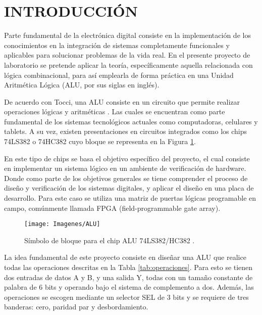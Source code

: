 \documentclass[journal,trans]{IEEEtran}
\begin{document}
\maketitle
\IEEEdisplaynontitleabstractindextext
\IEEEpeerreviewmaketitle

\section{INTRODUCCIÓN}

Parte fundamental de la electrónica digital consiste en la implementación de los conocimientos en la integración de sistemas completamente funcionales y aplicables para solucionar problemas de la vida real. En el presente proyecto de laboratorio se pretende aplicar la teoría, específicamente aquella relacionada con lógica combinacional, para así emplearla de forma práctica en una Unidad Aritmética Lógica (ALU, por sus siglas en inglés). 

De acuerdo con Tocci, una ALU consiste en un circuito que permite realizar operaciones lógicas y aritméticas \cite{Tocci}. Las cuales se encuentran como parte fundamental de los sistemas tecnológicos actuales como computadoras, celulares y tablets. A su vez, existen presentaciones en circuitos integrados como los chips 74LS382 o 74HC382 cuyo bloque se representa en la Figura \ref{fig:ALU}. 

En este tipo de chips se basa el objetivo específico del proyecto, el cual consiste en implementar un sistema lógico en un ambiente de verificación de hardware. Donde como parte de los objetivos generales se tiene comprender el proceso de diseño y verificación de los sistemas digitales, y aplicar el diseño en una placa de desarrollo. Para este caso se utiliza una matriz de puertas lógicas programable en campo, comúnmente llamada FPGA (field-programmable gate array).

\begin{figure}[!h]
	\centering
	\texttt{[image: Imagenes/ALU]}
	\caption{Símbolo de bloque para el chip ALU 74LS382/HC382 \cite{Tocci}.}
	\label{fig:ALU}
\end{figure}

La idea fundamental de este proyecto consiste en diseñar una ALU que realice todas las operaciones descritas en la Tabla \ref{tab:operaciones}. Para esto se tienen dos entradas de datos A y B, y una salida Y, todas con un tamaño constante de palabra de 6 bits y operando bajo el sistema de complemento a dos. Además, las operaciones se escogen mediante un selector SEL de 3 bits y se requiere de tres banderas: cero, paridad par y desbordamiento. 
\end{document}

